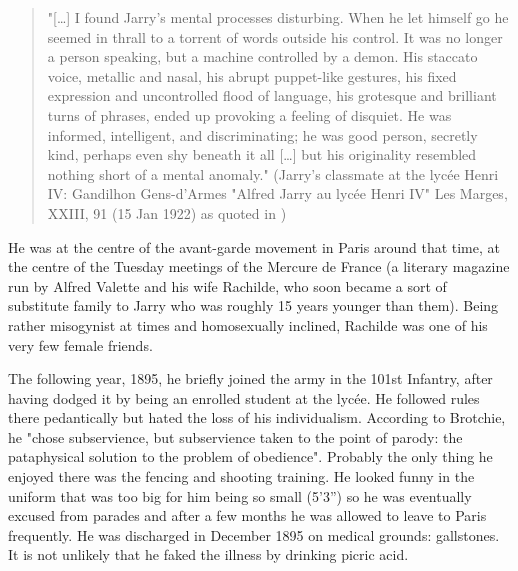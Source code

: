\begin{quote}
  "[…] I found Jarry's mental processes disturbing. When he let himself go he seemed in thrall to a torrent of words outside his control. It was no longer a person speaking, but a machine controlled by a demon. His staccato voice, metallic and nasal, his abrupt puppet-like gestures, his fixed expression and uncontrolled flood of language, his grotesque and brilliant turns of phrases, ended up provoking a feeling of disquiet. He was informed, intelligent, and discriminating; he was good person, secretly kind, perhaps even shy beneath it all […] but his originality resembled nothing short of a mental anomaly." (Jarry's classmate at the lycée Henri IV: Gandilhon Gens-d'Armes "Alfred Jarry au lycée Henri IV" Les Marges, XXIII, 91 (15 Jan 1922) as quoted in \citep{Brotchie2011})
\end{quote}

He was at the centre of the avant-garde movement in Paris around that time, at the centre of the Tuesday meetings of the Mercure de France (a literary magazine run by Alfred Valette and his wife Rachilde, who soon became a sort of substitute family to Jarry who was roughly 15 years younger than them). Being rather misogynist at times and homosexually inclined, Rachilde was one of his very few female friends.

The following year, 1895, he briefly joined the army in the 101st Infantry, after having dodged it by being an enrolled student at the lycée. He followed rules there pedantically but hated the loss of his individualism. According to Brotchie, he "chose subservience, but subservience taken to the point of parody: the pataphysical solution to the problem of obedience"\citep{Brotchie2011}. Probably the only thing he enjoyed there was the fencing and shooting training. He looked funny in the uniform that was too big for him being so small (5'3'') so he was eventually excused from parades and after a few months he was allowed to leave to Paris frequently. He was discharged in December 1895 on medical grounds: gallstones. It is not unlikely that he faked the illness by drinking picric acid.

